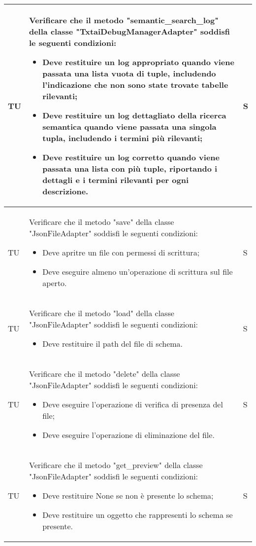 \begin{adjustwidth}{-0.5cm}{-0.5cm}
\begin{longtable}{|P{1.5cm}|>{\raggedright}P{9.5cm}|>{\arraybackslash}P{1.5cm}|}
		\hline TU & Verificare che il metodo "semantic\_search\_log" della classe "TxtaiDebugManagerAdapter" soddisfi le seguenti condizioni:
		\begin{itemize}
			\item Deve restituire un log appropriato quando viene passata una lista vuota di tuple, includendo l'indicazione che non sono state trovate tabelle rilevanti;
			\item Deve restituire un log dettagliato della ricerca semantica quando viene passata una singola tupla, includendo i termini più rilevanti;
			\item Deve restituire un log corretto quando viene passata una lista con più tuple, riportando i dettagli e i termini rilevanti per ogni descrizione.
		\end{itemize} & S \\

		\hline TU & Verificare che il metodo "save" della classe "JsonFileAdapter" soddisfi le seguenti condizioni:
		\begin{itemize}
			\item Deve apritre un file con permessi di scrittura;
			\item Deve eseguire almeno un'operazione di scrittura sul file aperto.
		\end{itemize} & S \\

		\hline TU & Verificare che il metodo "load" della classe "JsonFileAdapter" soddisfi le seguenti condizioni:
		\begin{itemize}
			\item Deve restituire il path del file di schema.
		\end{itemize} & S \\

		\hline TU & Verificare che il metodo "delete" della classe "JsonFileAdapter" soddisfi le seguenti condizioni:
		\begin{itemize}
			\item Deve eseguire l'operazione di verifica di presenza del file;
			\item Deve eseguire l'operazione di eliminazione del file.
		\end{itemize} & S \\

		\hline TU & Verificare che il metodo "get\_preview" della classe "JsonFileAdapter" soddisfi le seguenti condizioni:
		\begin{itemize}
			\item Deve restituire None se non è presente lo schema;
			\item Deve restituire un oggetto che rappresenti lo schema se presente.
		\end{itemize} & S \\


\end{longtable}
\end{adjustwidth}
